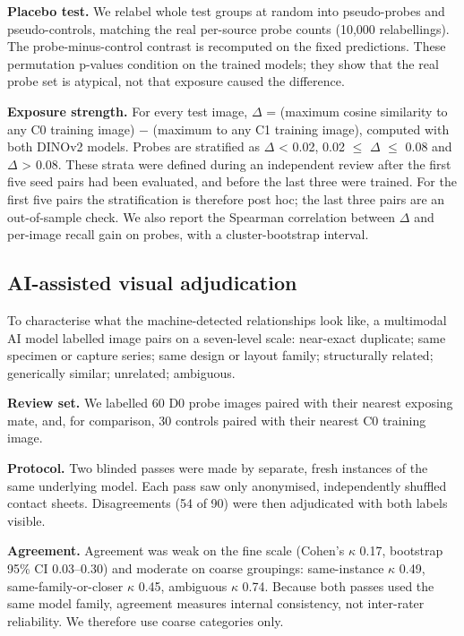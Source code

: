 \documentclass[11pt]{article}
\begin{document}
\textbf{Placebo test.} We relabel whole test groups at random into pseudo-probes and pseudo-controls, matching the real per-source probe counts (10,000 relabellings). The probe-minus-control contrast is recomputed on the fixed predictions. These permutation p-values condition on the trained models; they show that the real probe set is atypical, not that exposure caused the difference.

\textbf{Exposure strength.} For every test image, $\Delta$ = (maximum cosine similarity to any C0 training image) $-$ (maximum to any C1 training image), computed with both DINOv2 models. Probes are stratified as $\Delta$ < 0.02, 0.02 $\leq$ $\Delta$ $\leq$ 0.08 and $\Delta$ > 0.08. These strata were defined during an independent review after the first five seed pairs had been evaluated, and before the last three were trained. For the first five pairs the stratification is therefore post hoc; the last three pairs are an out-of-sample check. We also report the Spearman correlation between $\Delta$ and per-image recall gain on probes, with a cluster-bootstrap interval.

\subsection{AI-assisted visual adjudication}
To characterise what the machine-detected relationships look like, a multimodal AI model labelled image pairs on a seven-level scale: near-exact duplicate; same specimen or capture series; same design or layout family; structurally related; generically similar; unrelated; ambiguous.

\textbf{Review set.} We labelled 60 D0 probe images paired with their nearest exposing mate, and, for comparison, 30 controls paired with their nearest C0 training image.

\textbf{Protocol.} Two blinded passes were made by separate, fresh instances of the same underlying model. Each pass saw only anonymised, independently shuffled contact sheets. Disagreements (54 of 90) were then adjudicated with both labels visible.

\textbf{Agreement.} Agreement was weak on the fine scale (Cohen's $\kappa$ 0.17, bootstrap 95\% CI 0.03--0.30) and moderate on coarse groupings: same-instance $\kappa$ 0.49, same-family-or-closer $\kappa$ 0.45, ambiguous $\kappa$ 0.74. Because both passes used the same model family, agreement measures internal consistency, not inter-rater reliability. We therefore use coarse categories only.
\end{document}
